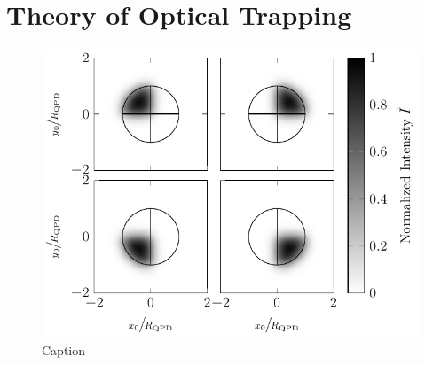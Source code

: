 \renewcommand{\relPath}{SECTION/20_Theory}
\chapter[Theory]{Theory of Optical Trapping}\label{ch:theory}

\lipsum[1-5]

\begin{figure}[htp]
  \centering
  \includegraphics[]{Plots/cache/V_quadrant.pdf}
  \caption{Caption}
  \label{fig:Th-quadrant_Intensity}
\end{figure}

